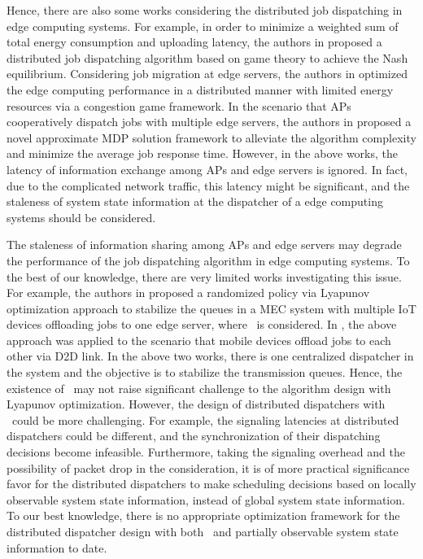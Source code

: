 Hence, there are also some works considering the distributed job dispatching in edge computing systems.
For example, in order to minimize a weighted sum of total energy consumption and uploading latency, the authors in \cite{ToN-Xuchen2016} proposed a distributed job dispatching algorithm based on game theory to achieve the Nash equilibrium. 
Considering job migration at edge servers, the authors in \cite{ToN-xujie2018} optimized the edge computing performance in a distributed manner with limited energy resources via a congestion game framework.
In the scenario that APs cooperatively dispatch jobs with multiple edge servers, the authors in \cite{mdp-jcin} proposed a novel approximate MDP solution framework to alleviate the algorithm complexity and minimize the average job response time.
However, in the above works, the latency of information exchange among APs and edge servers is ignored.
In fact, due to the complicated network traffic, this latency might be significant, and the staleness of system state information at the dispatcher of a edge computing systems should be considered.

The staleness of information sharing among APs and edge servers may degrade the performance of the job dispatching algorithm in edge computing systems.
To the best of our knowledge, there are very limited works investigating this issue.
For example, the authors in \cite{JSAC17-LyuX} proposed a randomized policy via Lyapunov optimization approach to stabilize the queues in a MEC system with multiple IoT devices offloading jobs to one edge server, where \brlatency~is considered. 
In \cite{TWC18-LyuX}, the above approach was applied to the scenario that mobile devices offload jobs to each other via D2D link.
In the above two works, there is one centralized dispatcher in the system and the objective is to stabilize the transmission queues.
Hence, the existence of \brlatency~may not raise significant challenge to the algorithm design with Lyapunov optimization.
However, the design of distributed dispatchers with \brlatency~could be more challenging.
For example, the signaling latencies at distributed dispatchers could be different, and the synchronization of their dispatching decisions become infeasible.
Furthermore, taking the signaling overhead and the possibility of packet drop in the consideration, it is of more practical significance favor for the distributed dispatchers to make scheduling decisions based on locally observable system state information, instead of global system state information.
To our best knowledge, there is no appropriate optimization framework for the distributed dispatcher design with both \brlatency~and partially observable system state information to date.

